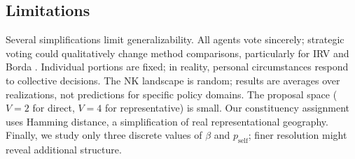 \subsection{Limitations}

Several simplifications limit generalizability. All agents vote sincerely; strategic voting could qualitatively change method comparisons, particularly for IRV and Borda \citep{gibbard1973manipulation}. Individual portions are fixed; in reality, personal circumstances respond to collective decisions. The NK landscape is random; results are averages over realizations, not predictions for specific policy domains. The proposal space ($V = 2$ for direct, $V = 4$ for representative) is small. Our constituency assignment uses Hamming distance, a simplification of real representational geography. Finally, we study only three discrete values of $\beta$ and $p_{\mathrm{self}}$; finer resolution might reveal additional structure.
